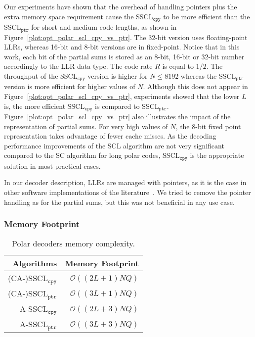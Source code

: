 Our experiments have shown that the overhead of handling pointers plus the
extra memory space requirement cause the SSCL$_{\texttt{cpy}}$ to be more
efficient than the SSCL$_{\texttt{ptr}}$ for short and medium code lengths, as
shown in Figure~\ref{plot:opt_polar_scl_cpy_vs_ptr}. The 32-bit version uses
floating-point LLRs, whereas 16-bit and 8-bit versions are in fixed-point.
Notice that in this work, each bit of the partial sums is stored as an 8-bit,
16-bit or 32-bit number accordingly to the LLR data type. The code rate $R$ is
equal to $1/2$. The throughput of the SSCL$_{\texttt{cpy}}$ version is higher
for $N \leq 8192$ whereas the SSCL$_{\texttt{ptr}}$ version is more efficient
for higher values of $N$. Although this does not appear in
Figure~\ref{plot:opt_polar_scl_cpy_vs_ptr}, experiments showed that the lower
$L$ is, the more efficient SSCL$_{\texttt{cpy}}$ is compared to
SSCL$_{\texttt{ptr}}$. Figure~\ref{plot:opt_polar_scl_cpy_vs_ptr} also
illustrates the impact of the representation of partial sums. For very high
values of $N$, the 8-bit fixed point representation takes advantage of fewer
cache misses. As the decoding performance improvements of the SCL algorithm are
not very significant compared to the SC algorithm for long polar codes,
SSCL$_{\texttt{cpy}}$ is the appropriate solution in most practical cases.

In our decoder description, LLRs are managed with pointers, as it is the case in
other software implementations of the literature~\cite{Sarkis2014b,Sarkis2016,
Shen2016}. We tried to remove the pointer handling as for the partial sums, but
this was not beneficial in any use case.

\subsubsection{Memory Footprint}

\begin{table}[htp]
  \centering
  \caption{Polar decoders memory complexity.}
  \label{tab:opt_polar_scl_memory_footprint}
  \begin{tabular}{r r}
    \textbf{Algorithms}        & \textbf{Memory Footprint} \\
    \hline
    \hline
    (CA-)SSCL$_{\texttt{cpy}}$ & $\mathcal{O}((2L + 1)NQ)$ \\
    (CA-)SSCL$_{\texttt{ptr}}$ & $\mathcal{O}((3L + 1)NQ)$ \\
    A-SSCL$_{\texttt{cpy}}$    & $\mathcal{O}((2L + 3)NQ)$ \\
    A-SSCL$_{\texttt{ptr}}$    & $\mathcal{O}((3L + 3)NQ)$ \\
 \end{tabular}
\end{table}

